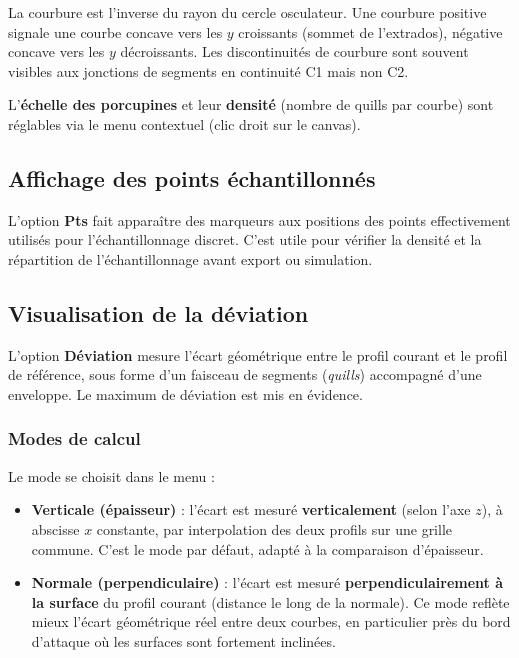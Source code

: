 
\begin{noteinfo}
La courbure est l'inverse du rayon du cercle osculateur.
Une courbure positive signale une courbe concave vers les
$y$ croissants (sommet de l'extrados), négative concave vers
les $y$ décroissants. Les discontinuités de courbure sont
souvent visibles aux jonctions de segments en continuité C1
mais non C2.
\end{noteinfo}

L'\textbf{échelle des porcupines} et leur \textbf{densité}
(nombre de quills par courbe) sont réglables via le menu
contextuel (clic droit sur le canvas).

\subsection{Affichage des points échantillonnés}

L'option \textbf{Pts} fait apparaître des marqueurs aux positions
des points effectivement utilisés pour l'échantillonnage
discret. C'est utile pour vérifier la densité et la répartition
de l'échantillonnage avant export ou simulation.


\subsection{Visualisation de la déviation}
\label{sec:deviation}

L'option \textbf{Déviation} mesure l'écart géométrique entre le
profil courant et le profil de référence, sous forme d'un faisceau
de segments (\emph{quills}) accompagné d'une enveloppe. Le maximum
de déviation est mis en évidence.

\subsubsection*{Modes de calcul}

Le mode se choisit dans le menu  :

\begin{itemize}
    \item \textbf{Verticale (épaisseur)} : l'écart est mesuré
        \textbf{verticalement} (selon l'axe $z$), à abscisse $x$
        constante, par interpolation des deux profils sur une grille
        commune. C'est le mode par défaut, adapté à la comparaison
        d'épaisseur.
    \item \textbf{Normale (perpendiculaire)} : l'écart est mesuré
        \textbf{perpendiculairement à la surface} du profil courant
        (distance le long de la normale). Ce mode reflète mieux
        l'écart géométrique réel entre deux courbes, en particulier
        près du bord d'attaque où les surfaces sont fortement
        inclinées.
\end{itemize}

